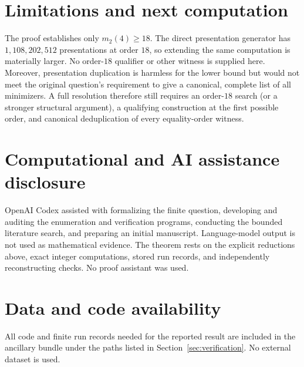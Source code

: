 \documentclass[11pt]{article}
\theoremstyle{definition}
\begin{document}
\section{Limitations and next computation}

The proof establishes only $m_2(4)\geq18$.  The direct presentation generator
has $1{,}108{,}202{,}512$ presentations at order $18$, so extending the same
computation is materially larger.  No order-$18$ qualifier or other witness
is supplied here.  Moreover, presentation duplication is harmless for the
lower bound but would not meet the original question's requirement to give a
canonical, complete list of all minimizers.  A full resolution therefore
still requires an order-$18$ search (or a stronger structural argument), a
qualifying construction at the first possible order, and canonical
deduplication of every equality-order witness.

\section*{Computational and AI assistance disclosure}

OpenAI Codex assisted with formalizing the finite question, developing and
auditing the enumeration and verification programs, conducting the bounded
literature search, and preparing an initial manuscript.  Language-model
output is not used as mathematical evidence.  The theorem rests on the
explicit reductions above, exact integer computations, stored run records,
and independently reconstructing checks.  No proof assistant was used.

\section*{Data and code availability}

All code and finite run records needed for the reported result are included
in the ancillary bundle under the paths listed in
Section~\ref{sec:verification}.  No external dataset is used.



\end{document}
